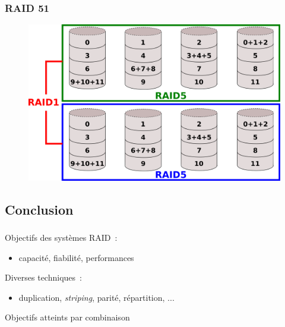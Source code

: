 \begin{frame}
\frametitle{RAID 51}
\vspace{-0.2cm}
\begin{figure}
  \includegraphics[width=\linewidth]{fig3/RAID51}
\end{figure}
\end{frame}

\subsection{Conclusion}
\begin{frame}
  \frametitle{\insertsubsection}
  \large
  Objectifs des systèmes RAID~: 
  \begin{itemize}
  \item capacité, fiabilité, performances
  \end{itemize}
  \vspace{0.5cm}
  Diverses techniques~: 
  \begin{itemize}
  \item duplication, \emph{striping}, parité, répartition, ...
  \end{itemize}
  \vspace{0.5cm}
   Objectifs atteints par combinaison
\end{frame}






